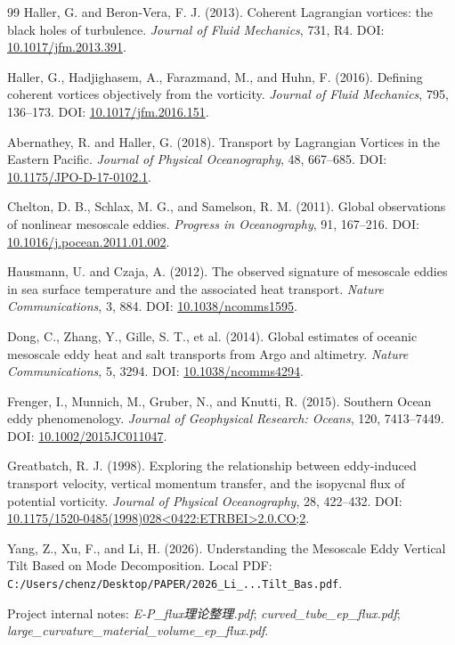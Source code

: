 \documentclass[UTF8,12pt]{ctexart}
\begin{document}
\begin{thebibliography}{99}
Haller, G. and Beron-Vera, F. J. (2013).
Coherent Lagrangian vortices: the black holes of turbulence.
\textit{Journal of Fluid Mechanics}, 731, R4.
DOI: \href{https://doi.org/10.1017/jfm.2013.391}{10.1017/jfm.2013.391}.

Haller, G., Hadjighasem, A., Farazmand, M., and Huhn, F. (2016).
Defining coherent vortices objectively from the vorticity.
\textit{Journal of Fluid Mechanics}, 795, 136--173.
DOI: \href{https://doi.org/10.1017/jfm.2016.151}{10.1017/jfm.2016.151}.

Abernathey, R. and Haller, G. (2018).
Transport by Lagrangian Vortices in the Eastern Pacific.
\textit{Journal of Physical Oceanography}, 48, 667--685.
DOI: \href{https://doi.org/10.1175/JPO-D-17-0102.1}{10.1175/JPO-D-17-0102.1}.

Chelton, D. B., Schlax, M. G., and Samelson, R. M. (2011).
Global observations of nonlinear mesoscale eddies.
\textit{Progress in Oceanography}, 91, 167--216.
DOI: \href{https://doi.org/10.1016/j.pocean.2011.01.002}{10.1016/j.pocean.2011.01.002}.

Hausmann, U. and Czaja, A. (2012).
The observed signature of mesoscale eddies in sea surface temperature and the associated heat transport.
\textit{Nature Communications}, 3, 884.
DOI: \href{https://doi.org/10.1038/ncomms1595}{10.1038/ncomms1595}.

Dong, C., Zhang, Y., Gille, S. T., et al. (2014).
Global estimates of oceanic mesoscale eddy heat and salt transports from Argo and altimetry.
\textit{Nature Communications}, 5, 3294.
DOI: \href{https://doi.org/10.1038/ncomms4294}{10.1038/ncomms4294}.

Frenger, I., Munnich, M., Gruber, N., and Knutti, R. (2015).
Southern Ocean eddy phenomenology.
\textit{Journal of Geophysical Research: Oceans}, 120, 7413--7449.
DOI: \href{https://doi.org/10.1002/2015JC011047}{10.1002/2015JC011047}.

Greatbatch, R. J. (1998).
Exploring the relationship between eddy-induced transport velocity, vertical momentum transfer, and the isopycnal flux of potential vorticity.
\textit{Journal of Physical Oceanography}, 28, 422--432.
DOI: \href{https://doi.org/10.1175/1520-0485(1998)028<0422:ETRBEI>2.0.CO;2}{10.1175/1520-0485(1998)028<0422:ETRBEI>2.0.CO;2}.

Yang, Z., Xu, F., and Li, H. (2026).
Understanding the Mesoscale Eddy Vertical Tilt Based on Mode Decomposition.
Local PDF: \texttt{C:/Users/chenz/Desktop/PAPER/2026\_Li\_...Tilt\_Bas.pdf}.

Project internal notes:
\textit{E-P\_flux理论整理.pdf};
\textit{curved\_tube\_ep\_flux.pdf};
\textit{large\_curvature\_material\_volume\_ep\_flux.pdf}.
\end{thebibliography}
\end{document}
